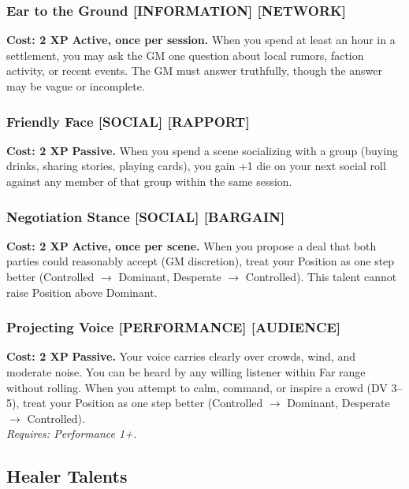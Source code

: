 \subsubsection*{Ear to the Ground \textnormal{[INFORMATION] [NETWORK]}}
\label{talent:ear-to-the-ground}
\textbf{Cost: 2 XP} \textbf{Active, once per session.} When you spend at least an hour in a settlement, you may ask the GM one question about local rumors, faction activity, or recent events. The GM must answer truthfully, though the answer may be vague or incomplete.

\subsubsection*{Friendly Face \textnormal{[SOCIAL] [RAPPORT]}}
\label{talent:friendly-face}
\textbf{Cost: 2 XP} \textbf{Passive.} When you spend a scene socializing with a group (buying drinks, sharing stories, playing cards), you gain +1 die on your next social roll against any member of that group within the same session.

\subsubsection*{Negotiation Stance \textnormal{[SOCIAL] [BARGAIN]}}
\label{talent:negotiation-stance}
\textbf{Cost: 2 XP} \textbf{Active, once per scene.} When you propose a deal that both parties could reasonably accept (GM discretion), treat your Position as one step better (Controlled $\rightarrow$ Dominant, Desperate $\rightarrow$ Controlled). This talent cannot raise Position above Dominant.

\subsubsection*{Projecting Voice \textnormal{[PERFORMANCE] [AUDIENCE]}}
\label{talent:projecting-voice}
\textbf{Cost: 2 XP} \textbf{Passive.} Your voice carries clearly over crowds, wind, and moderate noise. You can be heard by any willing listener within Far range without rolling. When you attempt to calm, command, or inspire a crowd (DV 3--5), treat your Position as one step better (Controlled $\rightarrow$ Dominant, Desperate $\rightarrow$ Controlled). \\
\textit{Requires: Performance 1+.}

\subsection*{Healer Talents}
\label{sec:minor-healer}

